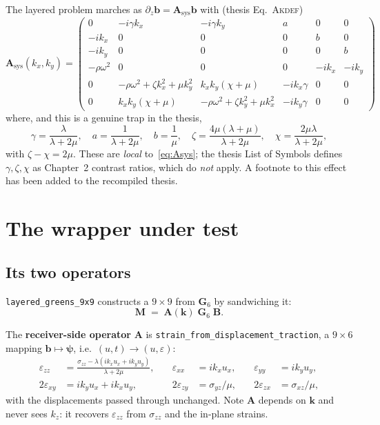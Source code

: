 \documentclass[11pt,a4paper]{article}
\newcommand{\bA}{\mathbf{A}}
\newcommand{\bB}{\mathbf{B}}
\newcommand{\bG}{\mathbf{G}}
\newcommand{\bM}{\mathbf{M}}
\newcommand{\Asys}{\mathbf{A}_{\text{sys}}}
\begin{document}
The layered problem marches as $\partial_z \mathbf{b} = \Asys \mathbf{b}$ with
(thesis Eq.~\textsc{Akdef})
\begin{equation}\label{eq:Asys}
  \Asys(k_x,k_y) =
  \begin{pmatrix}
    0 & -i\gamma k_x & -i\gamma k_y & a & 0 & 0\\
    -ik_x & 0&0&0& b & 0\\
    -ik_y & 0&0&0&0& b\\
    -\rho\omega^2 & 0&0&0& -ik_x & -ik_y\\
    0 & -\rho\omega^2 + \zeta k_x^2 + \mu k_y^2 & k_xk_y(\chi+\mu) & -ik_x\gamma & 0&0\\
    0 & k_xk_y(\chi+\mu) & -\rho\omega^2 + \zeta k_y^2 + \mu k_x^2 & -ik_y\gamma & 0&0
  \end{pmatrix}
\end{equation}
where, and this is a genuine trap in the thesis,
\begin{equation}\label{eq:shorthand}
  \gamma = \frac{\lambda}{\lambda+2\mu},\quad
  a = \frac{1}{\lambda+2\mu},\quad
  b = \frac{1}{\mu},\quad
  \zeta = \frac{4\mu(\lambda+\mu)}{\lambda+2\mu},\quad
  \chi = \frac{2\mu\lambda}{\lambda+2\mu},
\end{equation}
with $\zeta-\chi = 2\mu$.  These are \emph{local} to~\eqref{eq:Asys}; the
thesis List of Symbols defines $\gamma,\zeta,\chi$ as Chapter~2 contrast
ratios, which do \emph{not} apply.  A footnote to this effect has been added to
the recompiled thesis.

\section{The wrapper under test}

\subsection{Its two operators}

\texttt{layered\_greens\_9x9} constructs a $9\times9$ from $\bG_6$ by
sandwiching it:
\begin{equation}\label{eq:wrapper}
  \bM \;=\; \bA(\mathbf{k})\;\bG_6\;\bB .
\end{equation}

The \textbf{receiver-side operator} $\bA$ is
\texttt{strain\_from\_displacement\_traction}, a $9\times6$ mapping
$\mathbf{b}\mapsto\boldsymbol{\psi}$, i.e.\ $(u,t)\to(u,\varepsilon)$:
\begin{equation}\label{eq:A}
\begin{aligned}
  \varepsilon_{zz} &= \frac{\sigma_{zz} - \lambda(ik_x u_x + ik_y u_y)}{\lambda+2\mu},
  &\quad \varepsilon_{xx} &= ik_x u_x, &\quad \varepsilon_{yy} &= ik_y u_y,\\
  2\varepsilon_{xy} &= ik_y u_x + ik_x u_y,
  &\quad 2\varepsilon_{zy} &= \sigma_{yz}/\mu, &\quad 2\varepsilon_{zx} &= \sigma_{xz}/\mu,
\end{aligned}
\end{equation}
with the displacements passed through unchanged.  Note $\bA$ depends on
$\mathbf{k}$ and never sees $k_z$: it recovers $\varepsilon_{zz}$ from
$\sigma_{zz}$ and the in-plane strains.
\end{document}
